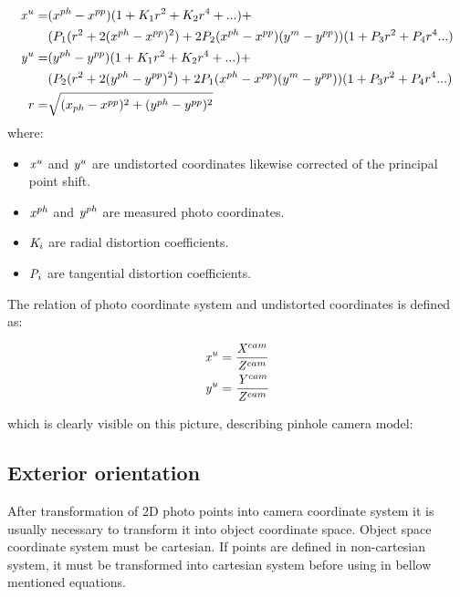 \documentclass[a4paper,12pt]{report}
\newcommand{\escal}[1]{
{\it #1}
}
\begin{document}
\begin{equation}
\label{eq:undistort}
\begin{split}
\escal{x}^{u} =& (x^{ph} - x^{pp})(1 + K_{1}r^2 + K_2r^4 + ...) + \\
&(P_1(r^2 + 2(x^{ph} - x^{pp})^2) + 2P_2(x^{ph} - x^{pp})(y^{m} - y^{pp}))(1 + P_3r^2 + P_4r^4 ...) \\
\escal{y}^{u} =& (y^{ph} - y^{pp})(1 + K_1r^2 + K_2r^4 + ...) + \\
&(P_2(r^2 + 2(y^{ph} - y^{pp})^2) + 2P_1(x^{ph} - x^{pp})(y^{m} - y^{pp}))(1 + P_3r^2 + P_4r^4 ...) \\
r =& \sqrt{(x_{ph} - x^{pp})^2 + (y^{ph} - y^{pp})^2}
\end{split}
\end{equation}
where:
\begin{itemize}
  \item $\escal{x}^{u}$ and $\escal{y}^{u}$  are undistorted coordinates likewise corrected of the principal point shift.
  \item $\escal{x}^{ph}$ and $\escal{y}^{ph}$ are measured photo coordinates.
  \item $\escal{K}_{i}$ are radial distortion coefficients.
  \item $\escal{P}_{i}$ are tangential distortion coefficients.
\end{itemize}


The relation of photo coordinate system and undistorted coordinates is defined as:

\begin{equation}
\begin{split}
&\escal{x}^{u} = \frac{\escal{X}^{cam}}{\escal{Z}^{cam}} \\
&\escal{y}^{u} = \frac{\escal{Y}^{cam}}{\escal{Z}^{cam}}
\end{split}
\end{equation}

which is clearly visible on this picture, describing pinhole camera model:



\subsection{Exterior orientation}

After transformation of 2D photo points into camera coordinate system it is usually necessary to transform it into object coordinate space.
Object space coordinate system must be cartesian. If points are defined in non-cartesian system, it must be transformed into cartesian 
system before using in bellow mentioned equations.
\end{document}

